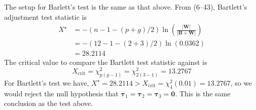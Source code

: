 \begin{enumerate}[label= (\alph*)]
    The setup for Barlett's test is the same as that above. From (6--43), Bartlett's adjustment test statistic is
    \begin{align*}
        X^{\star}
        & =
        -(n - 1 - (p + g)/2)
        \ln
        \left(
            \frac{|\textbf{W}|}{|\textbf{B} + \textbf{W}|}
        \right) \\
        & =
        -(12 - 1 - (2 + 3)/2)
        \ln
        \left(
            0.0362
        \right) \\
        & = 
        28.2114
    \end{align*}
    The critical value to compare the Bartlett test statistic against is
    \[
        X_{\text{crit}}
        =
        \chi_{p(g-1)}^{2}
        =
        \chi_{2(3-1)}^{2}
        =
        13.2767
    \]
    For Bartlett's test we have, $X^{\star} = 28.2114 > X_{\text{crit}} = \chi_{4}^{2}(0.01) = 13.2767$, so we would reject the null hypothesis that $\bm{\tau}_{1} = \bm{\tau}_{2} = \bm{\tau}_{3} = \textbf{0}$. This is the same conclusion as the test above.
\end{enumerate}